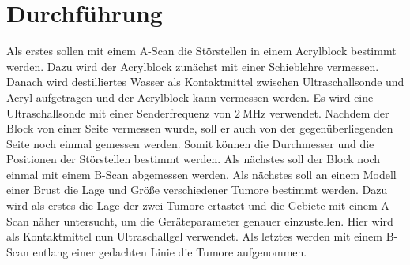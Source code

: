 \section{Durchführung}
\label{sec:Durchführung}

Als erstes sollen mit einem A-Scan die Störstellen in einem Acrylblock bestimmt werden. Dazu wird der Acrylblock zunächst mit einer Schieblehre vermessen. Danach wird
destilliertes Wasser als Kontaktmittel zwischen Ultraschallsonde und Acryl aufgetragen und der Acrylblock kann vermessen werden.  Es wird eine Ultraschallsonde mit einer Senderfrequenz
von $\SI{2}{\mega\hertz}$ verwendet. Nachdem der Block von einer Seite vermessen wurde, soll er auch von der gegenüberliegenden Seite noch einmal gemessen werden. Somit können die Durchmesser
und die Positionen der Störstellen bestimmt werden.
Als nächstes soll der Block noch einmal mit einem B-Scan abgemessen werden. \newline
Als nächstes soll an einem Modell einer Brust die Lage und Größe verschiedener Tumore bestimmt werden. Dazu wird als erstes die Lage der zwei Tumore ertastet und die Gebiete
mit einem A-Scan näher untersucht, um die Geräteparameter genauer einzustellen. Hier wird als Kontaktmittel nun Ultraschallgel verwendet. Als letztes werden mit einem B-Scan entlang einer gedachten Linie die Tumore
aufgenommen.